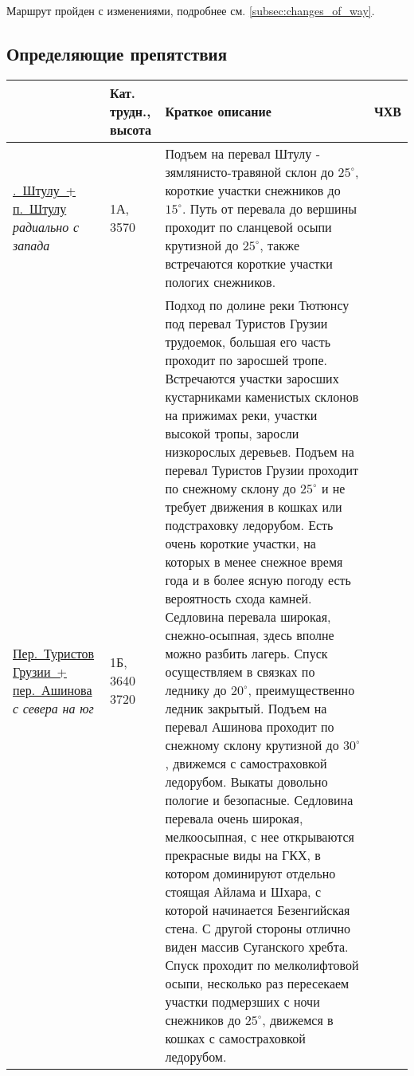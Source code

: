 		Маршрут пройден с изменениями, подробнее см. \ref{subsec:changes_of_way}.

	
	\subsection{Определяющие препятствия}\label{subsec:main_obstacles}
		\begin{longtable}{|>{\centering\arraybackslash}m{4.5cm}|>{\centering\arraybackslash}m{1.8cm}|>{\raggedright\arraybackslash}m{9.6cm}|>{\centering\arraybackslash}m{1.2cm}|} \hline
		{Препятствие}	&	{Кат. трудн., высота}				&	{Краткое описание}	&	{ЧХВ}	\\ \hline
			\hyperref[subsec:main_obstacles]{{.~Штулу~+ п.~Штулу}}														\newline\textit{радиально с запада}		&	1А, 	3570				&	{\small Подъем на перевал Штулу - зямлянисто-травяной склон до $25^\circ$, короткие участки снежников до $15^\circ$. Путь от перевала до вершины проходит по сланцевой осыпи крутизной до $25^\circ$, также встречаются короткие участки пологих снежников.} &		\\ \hline
			\hyperref[subsec:main_obstacles]{{\small Пер.~Туристов Грузии~+ пер.~Ашинова}}										\newline\textit{с севера на юг}			&	1Б, 3640 3720			&		{\small Подход по долине реки Тютюнсу под перевал Туристов Грузии трудоемок, большая его часть проходит по заросшей тропе. Встречаются участки заросших кустарниками каменистых склонов на прижимах реки, участки высокой тропы, заросли низкорослых деревьев. Подъем на перевал Туристов Грузии проходит по снежному склону до $25^\circ$ и не требует движения в кошках или подстраховку ледорубом. Есть очень короткие участки, на которых в менее снежное время года и в более ясную погоду есть вероятность схода камней. Седловина перевала широкая, снежно-осыпная, здесь вполне можно разбить лагерь. Спуск осуществляем в связках по леднику до $20^\circ$, преимущественно ледник закрытый. Подъем на перевал Ашинова проходит по снежному склону крутизной до $30^\circ$, движемся с самостраховкой ледорубом. Выкаты довольно пологие и безопасные. Седловина перевала очень широкая, мелкоосыпная, с нее открываются прекрасные виды на ГКХ, в котором доминируют отдельно стоящая Айлама и Шхара, с которой начинается Безенгийская стена. С другой стороны отлично виден массив Суганского хребта. Спуск проходит по мелколифтовой осыпи, несколько раз пересекаем участки подмерзших с ночи снежников до $25^\circ$, движемся в кошках с самостраховкой ледорубом.}&	\\ \hline

\end{longtable}
